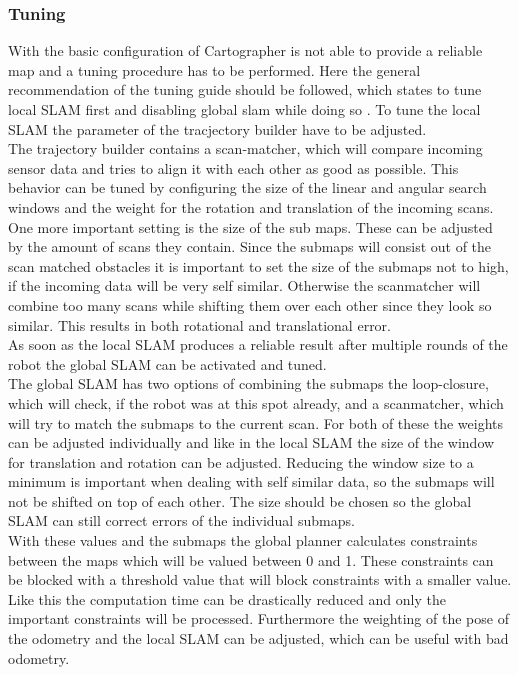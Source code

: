 \subsubsection{Tuning}
With the basic configuration of Cartographer is not able to provide a reliable map and a tuning procedure has to be performed. Here the general recommendation of the tuning guide should be followed, which states to tune local SLAM first and disabling global slam while doing so \cite{cartographertuning}.
To tune the local SLAM the parameter of the tracjectory builder have to be adjusted.\\
The trajectory builder contains a scan-matcher, which will compare incoming sensor data and tries to align it with each other as good as possible. This behavior can be tuned by configuring the size of the linear and angular search windows and the weight for the rotation and translation of the incoming scans.\\
One more important setting is the size of the sub maps. These can be adjusted by the amount of scans they contain. Since the submaps will consist out of the scan matched obstacles it is important to set the size of the submaps not to high, if the incoming data will be very self similar. Otherwise the scanmatcher will combine too many scans while shifting them over each other since they look so similar. This results in both rotational and translational error.\\
As soon as the local SLAM produces a reliable result after multiple rounds of the robot the global SLAM can be activated and tuned.\\

The global SLAM has two options of combining the submaps the loop-closure, which will check, if the robot was at this spot already, and a scanmatcher, which will try to match the submaps to the current scan. For both of these the weights can be adjusted individually and like in the local SLAM the size of the window for translation and rotation can be adjusted. Reducing the window size to a minimum is important when dealing with self similar data, so the submaps will not be shifted on top of each other. The size should be chosen so the global SLAM can still correct errors of the individual submaps.\\
With these values and the submaps the global planner calculates constraints between the maps which will be valued between 0 and 1. These constraints can be blocked with a threshold value that will block constraints with a smaller value. Like this the computation time can be drastically reduced and only the important constraints will be processed. Furthermore the weighting of the pose of the odometry and the local SLAM can be adjusted, which can be useful with bad odometry.


